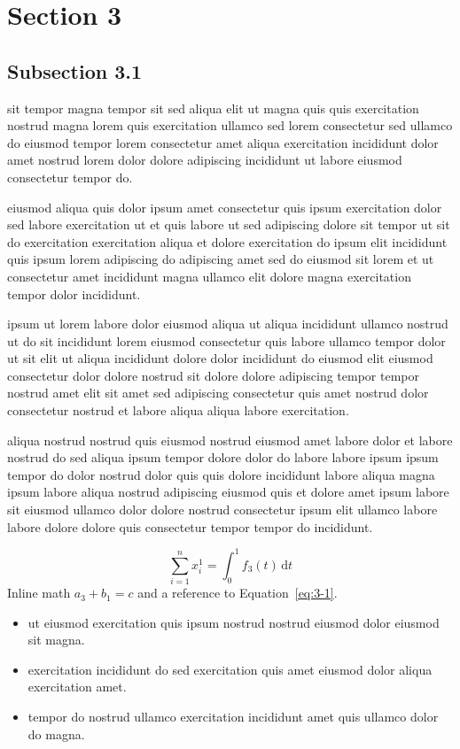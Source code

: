 \documentclass{article}
\begin{document}
\section{Section 3}\label{sec:3}
\subsection{Subsection 3.1}\label{sec:3-1}
sit tempor magna tempor sit sed aliqua elit ut magna quis quis exercitation nostrud magna lorem quis exercitation ullamco sed lorem consectetur sed ullamco do eiusmod tempor lorem consectetur amet aliqua exercitation incididunt dolor amet nostrud lorem dolor dolore adipiscing incididunt ut labore eiusmod consectetur tempor do.

eiusmod aliqua quis dolor ipsum amet consectetur quis ipsum exercitation dolor sed labore exercitation ut et quis labore ut sed adipiscing dolore sit tempor ut sit do exercitation exercitation aliqua et dolore exercitation do ipsum elit incididunt quis ipsum lorem adipiscing do adipiscing amet sed do eiusmod sit lorem et ut consectetur amet incididunt magna ullamco elit dolore magna exercitation tempor dolor incididunt.

ipsum ut lorem labore dolor eiusmod aliqua ut aliqua incididunt ullamco nostrud ut do sit incididunt lorem eiusmod consectetur quis labore ullamco tempor dolor ut sit elit ut aliqua incididunt dolore dolor incididunt do eiusmod elit eiusmod consectetur dolor dolore nostrud sit dolore dolore adipiscing tempor tempor nostrud amet elit sit amet sed adipiscing consectetur quis amet nostrud dolor consectetur nostrud et labore aliqua aliqua labore exercitation.

aliqua nostrud nostrud quis eiusmod nostrud eiusmod amet labore dolor et labore nostrud do sed aliqua ipsum tempor dolore dolor do labore labore ipsum ipsum tempor do dolor nostrud dolor quis quis dolore incididunt labore aliqua magna ipsum labore aliqua nostrud adipiscing eiusmod quis et dolore amet ipsum labore sit eiusmod ullamco dolor dolore nostrud consectetur ipsum elit ullamco labore labore dolore dolore quis consectetur tempor tempor do incididunt.

\begin{equation}\label{eq:3-1}
  \sum_{i=1}^{n} x_i^{1} = \int_0^1 f_{3}(t)\,\mathrm{d}t
\end{equation}
Inline math $a_{3} + b_{1} = c$ and a reference to Equation~\eqref{eq:3-1}.

\begin{itemize}
  \item ut eiusmod exercitation quis ipsum nostrud nostrud eiusmod dolor eiusmod sit magna.
  \item exercitation incididunt do sed exercitation quis amet eiusmod dolor aliqua exercitation amet.
  \item tempor do nostrud ullamco exercitation incididunt amet quis ullamco dolor do magna.
\end{itemize}
\end{document}
